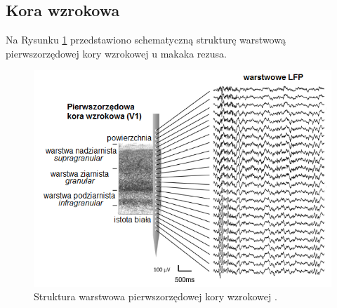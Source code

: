 \documentclass{pracamgr_2}
\begin{document}
	\subsection{Kora wzrokowa}
	Na Rysunku \ref{rys:warstwy} przedstawiono schematyczną strukturę warstwową pierwszorzędowej kory wzrokowej u makaka rezusa.
	\begin{figure}[htbp]
		\begin{center}
			\includegraphics[scale=0.55]{warstwy.png}
		\end{center}
		\caption{Struktura warstwowa pierwszorzędowej kory wzrokowej \citep{kora_warstwy}.}
		\label{rys:warstwy}
	\end{figure}
	\FloatBarrier
\end{document}
